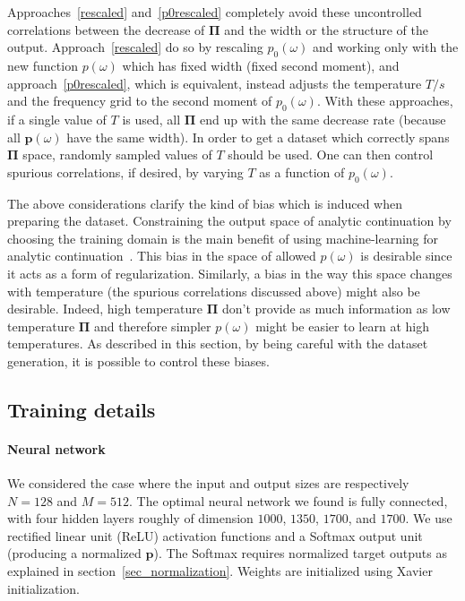 \documentclass[notitlepage,11pt,nofootinbib]{revtex4-1}
\renewcommand{\vec}[1]{\bm{#1}}
\begin{document}
Approaches~\ref{rescaled} and~\ref{p0rescaled} completely avoid these uncontrolled correlations between the decrease of $\vec \Pi$ and the width or the structure of the output. Approach~\ref{rescaled} do so by rescaling $p_0(\omega)$ and working only with the new function $p(\omega)$ which has fixed width (fixed second moment), and approach~\ref{p0rescaled}, which is equivalent, instead adjusts the temperature $T/s$ and the frequency grid to the second moment of $p_0(\omega)$.
With these approaches, if a single value of $T$ is used, all $\vec \Pi$ end up with the same decrease rate (because all $\vec p(\omega)$ have the same width). In order to get a dataset which correctly spans $\vec \Pi$ space, randomly sampled values of $T$ should be used. One can then control spurious correlations, if desired, by varying $T$ as a function of $p_0(\omega)$.

The above considerations clarify the kind of bias which is induced when preparing the dataset. Constraining the output space of analytic continuation by choosing the training domain is the main benefit of using machine-learning for analytic continuation~\cite{Arsenault2017}. This bias in the space of allowed $p(\omega)$ is desirable since it acts as a form of regularization. Similarly, a bias in the way this space changes with temperature (the spurious correlations discussed above) might also be desirable. Indeed, high temperature $\vec \Pi$ don't provide as much information as low temperature $\vec \Pi$ and therefore simpler $p(\omega)$ might be easier to learn at high temperatures. As described in this section, by being careful with the dataset generation, it is possible to control these biases.

\subsection{Training details}
\label{sec_training}

\paragraph*{Neural network} We considered the case where the input and output sizes are respectively $N=128$ and $M=512$. The optimal neural network we found is fully connected, with four hidden layers roughly of dimension $1000$, $1350$, $1700$, and $1700$. We use rectified linear unit (ReLU) activation functions and a Softmax output unit (producing a normalized $\vec p$). The Softmax requires normalized target outputs as explained in section~\ref{sec_normalization}. Weights are initialized using Xavier initialization.
\end{document}
